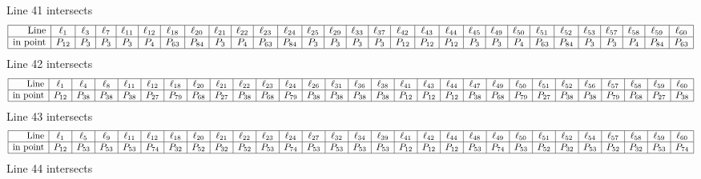 \documentclass{article}
\begin{document}
{$$$$
Line 41 intersects 
$$
\begin{array}{|r*{28}{|c}|}
\hline
\mbox{Line}  & \ell_{1} & \ell_{3} & \ell_{7} & \ell_{11} & \ell_{12} & \ell_{18} & \ell_{20} & \ell_{21} & \ell_{22} & \ell_{23} & \ell_{24} & \ell_{25} & \ell_{29} & \ell_{33} & \ell_{37} & \ell_{42} & \ell_{43} & \ell_{44} & \ell_{45} & \ell_{49} & \ell_{50} & \ell_{51} & \ell_{52} & \ell_{53} & \ell_{57} & \ell_{58} & \ell_{59} & \ell_{60}\\
\hline
\mbox{in point}  & P_{12} & P_{3} & P_{3} & P_{3} & P_{4} & P_{63} & P_{84} & P_{3} & P_{4} & P_{63} & P_{84} & P_{3} & P_{3} & P_{3} & P_{3} & P_{12} & P_{12} & P_{12} & P_{3} & P_{3} & P_{4} & P_{63} & P_{84} & P_{3} & P_{3} & P_{4} & P_{84} & P_{63}\\
\hline
\end{array}
$$
Line 42 intersects 
$$
\begin{array}{|r*{28}{|c}|}
\hline
\mbox{Line}  & \ell_{1} & \ell_{4} & \ell_{8} & \ell_{11} & \ell_{12} & \ell_{18} & \ell_{20} & \ell_{21} & \ell_{22} & \ell_{23} & \ell_{24} & \ell_{26} & \ell_{31} & \ell_{36} & \ell_{38} & \ell_{41} & \ell_{43} & \ell_{44} & \ell_{47} & \ell_{49} & \ell_{50} & \ell_{51} & \ell_{52} & \ell_{56} & \ell_{57} & \ell_{58} & \ell_{59} & \ell_{60}\\
\hline
\mbox{in point}  & P_{12} & P_{38} & P_{38} & P_{38} & P_{27} & P_{79} & P_{68} & P_{27} & P_{38} & P_{68} & P_{79} & P_{38} & P_{38} & P_{38} & P_{38} & P_{12} & P_{12} & P_{12} & P_{38} & P_{68} & P_{79} & P_{27} & P_{38} & P_{38} & P_{79} & P_{68} & P_{27} & P_{38}\\
\hline
\end{array}
$$
Line 43 intersects 
$$
\begin{array}{|r*{28}{|c}|}
\hline
\mbox{Line}  & \ell_{1} & \ell_{5} & \ell_{9} & \ell_{11} & \ell_{12} & \ell_{18} & \ell_{20} & \ell_{21} & \ell_{22} & \ell_{23} & \ell_{24} & \ell_{27} & \ell_{32} & \ell_{34} & \ell_{39} & \ell_{41} & \ell_{42} & \ell_{44} & \ell_{48} & \ell_{49} & \ell_{50} & \ell_{51} & \ell_{52} & \ell_{54} & \ell_{57} & \ell_{58} & \ell_{59} & \ell_{60}\\
\hline
\mbox{in point}  & P_{12} & P_{53} & P_{53} & P_{53} & P_{74} & P_{32} & P_{52} & P_{32} & P_{52} & P_{53} & P_{74} & P_{53} & P_{53} & P_{53} & P_{53} & P_{12} & P_{12} & P_{12} & P_{53} & P_{74} & P_{53} & P_{52} & P_{32} & P_{53} & P_{52} & P_{32} & P_{53} & P_{74}\\
\hline
\end{array}
$$
Line 44 intersects 
}
\end{document}
